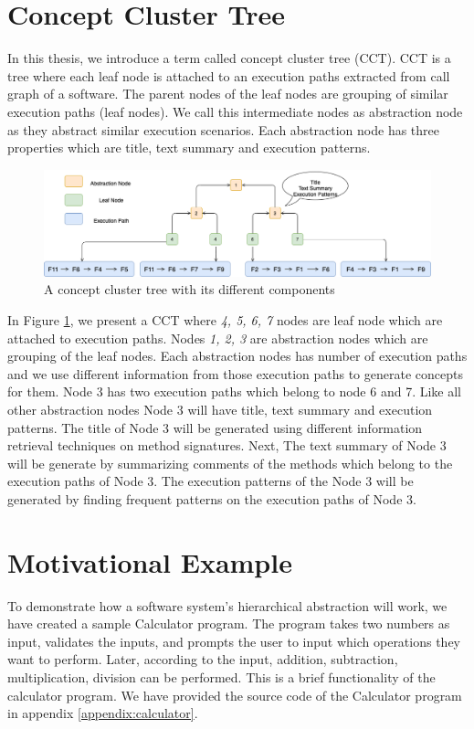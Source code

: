 \section{Concept Cluster Tree}
\label{background:cct}
In this thesis, we introduce a term called concept cluster tree (CCT). CCT is a tree where each leaf node is attached to an execution paths extracted from call graph of a software. The parent nodes of the leaf nodes are grouping of similar execution paths (leaf nodes). We call this intermediate nodes as abstraction node as they abstract similar execution scenarios. Each abstraction node has three properties which are title, text summary and execution patterns. 

\begin{figure}[h]
  \centering
  \includegraphics[width=\columnwidth]{figures/background/cct.png}
  \caption{A concept cluster tree with its different components }
  \label{background:cct}
\end{figure}
In Figure \ref{background:cct}, we present a CCT where \emph{4, 5, 6, 7} nodes are leaf node which are attached to execution paths. Nodes \emph{1, 2, 3} are abstraction nodes which are grouping of the leaf nodes. Each abstraction nodes has number of execution paths and we use different information from those execution paths to generate concepts for them. Node 3 has two execution paths which belong to node 6 and 7. Like all other abstraction nodes Node 3 will have title, text summary and execution patterns. The title of Node 3 will be generated using different information retrieval techniques on method signatures. Next, The text summary of Node 3 will be generate by summarizing comments of the methods which belong to the execution paths of Node 3. The execution patterns of the Node 3 will be generated by finding frequent patterns on the execution paths of Node 3.

\section{Motivational Example}
\label{background:motive}
To demonstrate how a software system's hierarchical abstraction will work, we have created a sample Calculator program. The program takes two numbers as input, validates the inputs, and prompts the user to input which operations they want to perform. Later, according to the input, addition, subtraction, multiplication, division can be performed. This is a brief functionality of the calculator program. We have provided the source code of the Calculator program in appendix \ref{appendix:calculator}.

